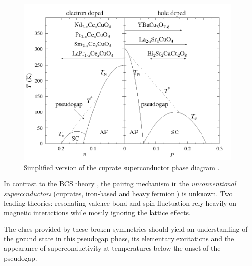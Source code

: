 \begin{figure}[ht]
  \centering
  \includegraphics[width=1.0\textwidth]{images/CuPhaseDiag.png}
  \caption[Simplified version of the cuprate superconductor phase diagram]
  {Simplified version of the cuprate superconductor phase diagram \protect\cite{CuPhaseDiag}.}
  \label{fig:CuPhaseDiag}
\end{figure}



In contrast to the BCS theory \cite{Bardeen1957}, the pairing mechanism in the \textit{unconventional superconductors} (cuprates, iron-based and heavy fermion \cite{Pfleiderer2009}) is unknown.
Two leading theories: resonating-valence-bond \cite{?} and spin fluctuation \cite{Scalapino2012} rely heavily on magnetic interactions while mostly ignoring the lattice effects.


The clues provided by these broken symmetries should yield an understanding of the ground state in this pseudogap phase, its elementary excitations and the appearance of superconductivity at temperatures below the onset of the pseudogap. 

